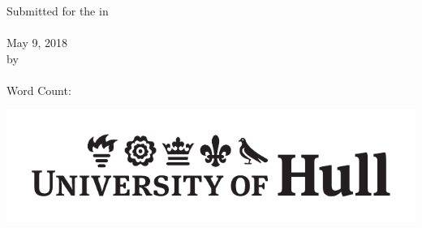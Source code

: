 \makeatletter
\begin{titlepage}

\vspace*{-5em}
~~

\vfill

\begin{center}
{\huge \textbf{\@title}}\\
\vspace*{1em}
{\LARGE \textbf{\reporttype{}}}\\
\vspace*{2em}
{\Large Submitted for the \degreetitle{} in}\\
\vspace*{0.5em}
{\Large \progname{}}\\
\vspace*{2em}
{\Large May 9, 2018}\\
\vspace*{2em}
{\Large by}\\
\vspace*{2em}
{\Large \textbf{\@author}}\\
\vspace*{3em}
{\large Word Count: \wordcount{}}
\end{center}

\vfill
\begin{center}
	\includegraphics[height=0.075\textheight]{title_page/UoH_Logo.pdf}
\end{center}

\end{titlepage}
\makeatother
